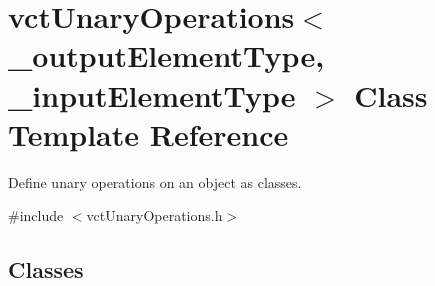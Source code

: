 \hypertarget{classvct_unary_operations}{\section{vct\-Unary\-Operations$<$ \-\_\-output\-Element\-Type, \-\_\-input\-Element\-Type $>$ Class Template Reference}
\label{classvct_unary_operations}
}


Define unary operations on an object as classes.  




{\ttfamily \#include $<$vct\-Unary\-Operations.\-h$>$}

\subsection*{Classes}
